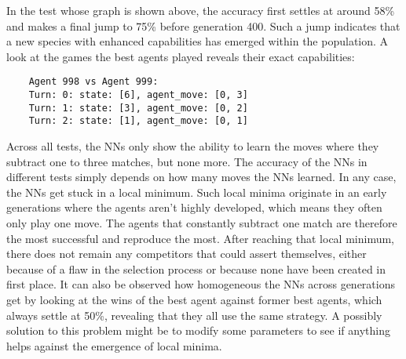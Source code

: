     In the test whose graph is shown above, the accuracy first settles at around 58\% and makes a final jump to 75\% before generation 400.
    Such a jump indicates that a new species with enhanced capabilities has emerged within the population.
    A look at the games the best agents played reveals their exact capabilities:
    \begin{verbatim}
    Agent 998 vs Agent 999:
    Turn: 0: state: [6], agent_move: [0, 3]
    Turn: 1: state: [3], agent_move: [0, 2]
    Turn: 2: state: [1], agent_move: [0, 1]
    \end{verbatim}
    Across all tests, the NNs only show the ability to learn the moves where they subtract one to three matches, but none more.
    The accuracy of the NNs in different tests simply depends on how many moves the NNs learned.
    In any case, the NNs get stuck in a local minimum.
    Such local minima originate in an early generations where the agents aren't highly developed, which means they often only play one move.
    The agents that constantly subtract one match are therefore the most successful and reproduce the most.
    After reaching that local minimum, there does not remain any competitors that could assert themselves, either because of a flaw in the selection process or because none have been created in first place.
    It can also be observed how homogeneous the NNs across generations get by looking at the wins of the best agent against former best agents, which always settle at 50\%, revealing that they all use the same strategy.
    A possibly solution to this problem might be to modify some parameters to see if anything helps against the emergence of local minima.

